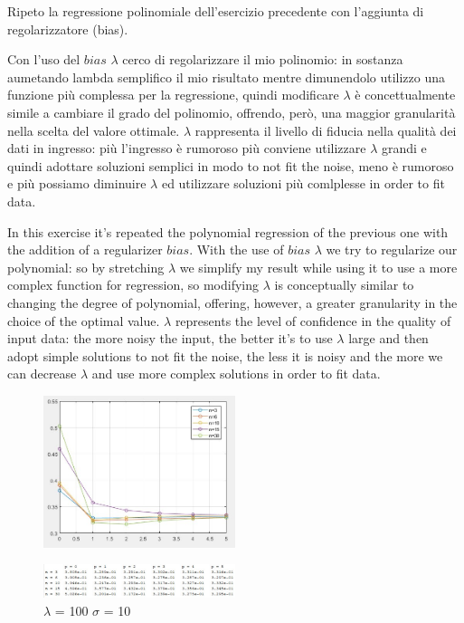 Ripeto la regressione polinomiale dell'esercizio precedente con l'aggiunta di regolarizzatore (bias).

Con l'uso del $ bias $ $\lambda$ cerco di regolarizzare il mio polinomio: in sostanza aumetando lambda semplifico il mio risultato mentre dimunendolo utilizzo una funzione più complessa per la regressione, quindi modificare $\lambda$ è concettualmente simile a cambiare il grado del polinomio, offrendo, però, una maggior granularità nella scelta del valore ottimale.
$\lambda$ rappresenta il livello di fiducia nella qualità dei dati in ingresso: più l'ingresso è rumoroso più conviene utilizzare $\lambda$ grandi e quindi adottare soluzioni semplici in modo to not fit the noise, meno è rumoroso e più possiamo diminuire $\lambda$ ed utilizzare soluzioni più comlplesse in order to fit data.

In this exercise it's repeated the polynomial regression of the previous one with the addition of a regularizer $bias$.
With the use of $ bias $ $\lambda$ we try to regularize our polynomial: so by stretching $\lambda$ we simplify my result while using it to use a more complex function for regression, so modifying $\lambda$ is conceptually similar to changing the degree of polynomial, offering, however, a greater granularity in the choice of the optimal value.
$\lambda$ represents the level of confidence in the quality of input data: the more noisy the input, the better it's to use $\lambda$ large and then adopt simple solutions to not fit the noise, the less it is noisy and the more we can decrease $\lambda$ and use more complex solutions in order to fit data.

\begin{figure}[h]
	\centering
	\includegraphics[width=0.5\textwidth]{pl100s10.png}
\end{figure}

\begin{figure}[h]
	\centering
	\includegraphics[width=0.5\textwidth]{tl100s10.png}
	\caption{$\lambda$ = 100 $\sigma$ = 10}
	\label{fig:lambda = 100 sigma = 10}
\end{figure}

